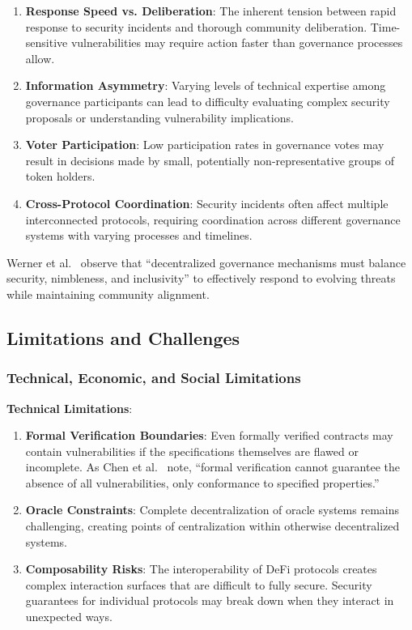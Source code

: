 \documentclass[conference]{IEEEtran}
\begin{document}
    \begin{enumerate}
        \item \textbf{Response Speed vs. Deliberation}: The inherent tension between rapid response to security incidents and thorough community deliberation. Time-sensitive vulnerabilities may require action faster than governance processes allow.
        
        \item \textbf{Information Asymmetry}: Varying levels of technical expertise among governance participants can lead to difficulty evaluating complex security proposals or understanding vulnerability implications.
        
        \item \textbf{Voter Participation}: Low participation rates in governance votes may result in decisions made by small, potentially non-representative groups of token holders.
        
        \item \textbf{Cross-Protocol Coordination}: Security incidents often affect multiple interconnected protocols, requiring coordination across different governance systems with varying processes and timelines.
    \end{enumerate}

    Werner et al.~\cite{werner2021sok} observe that ``decentralized governance mechanisms must balance security, nimbleness, and inclusivity'' to effectively respond to evolving threats while maintaining community alignment.

\subsection{Limitations and Challenges}
    \subsubsection{Technical, Economic, and Social Limitations}
    \textbf{Technical Limitations}:
    \begin{enumerate}
        \item \textbf{Formal Verification Boundaries}: Even formally verified contracts may contain vulnerabilities if the specifications themselves are flawed or incomplete. As Chen et al.~\cite{chen2025secure} note, ``formal verification cannot guarantee the absence of all vulnerabilities, only conformance to specified properties.''
        
        \item \textbf{Oracle Constraints}: Complete decentralization of oracle systems remains challenging, creating points of centralization within otherwise decentralized systems.
        
        \item \textbf{Composability Risks}: The interoperability of DeFi protocols creates complex interaction surfaces that are difficult to fully secure. Security guarantees for individual protocols may break down when they interact in unexpected ways.
    \end{enumerate}
\end{document}
